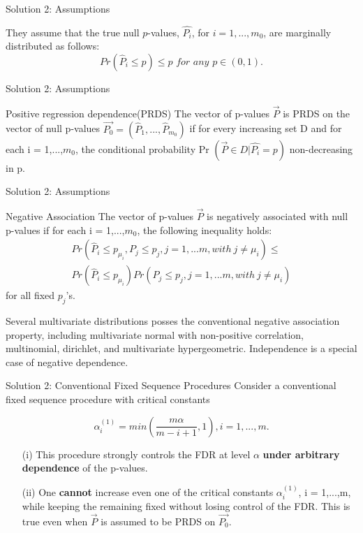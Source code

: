 \documentclass{beamer}
\begin{document}
\begin{frame}[t]{Solution 2: Assumptions}\vspace{10pt}

They assume that the true null $p$-values, $\hat{P_i}$, for $i = 1,...,m_0$, are marginally distributed as follows:
$$ Pr\left(\hat P_i \leq p \right) \leq p \,\,for \,\,any \,\,p \in (0,1).$$

\end{frame}

\begin{frame}[t]{Solution 2: Assumptions}\vspace{10pt}
\begin{block}{Positive regression dependence(PRDS)}
The vector of p-values $\overrightarrow{P}$ is PRDS on the vector of null p-values $\overrightarrow{P_0} = (\hat{P}_1,...,\hat{P}_{m_0})$ if for every increasing set D and for each i = 1,...,$m_0$, the conditional probability Pr $\left(\overrightarrow{P} \in D | \hat{P_i} = p\right)$ non-decreasing in p.
\end{block}
\end{frame}

\begin{frame}[t]{Solution 2: Assumptions}\vspace{10pt}
\begin{block}{Negative Association}
The vector of p-values $\overrightarrow{P}$ is negatively associated with null p-values if for each i = 1,...,$m_0$, the following inequality holds:
\begin{align*}
Pr\left( \hat{P}_i \leq p_{\mu_i} , P_j \leq p_j , j = 1,...m, with \ j \neq \mu_i \right) \leq \\
Pr \left(\hat{P}_i \leq p_{\mu_i} \right) Pr \left( P_j \leq p_j , j = 1,...m, with \ j \neq \mu_i\right)
\end{align*}
for all fixed $p_j$'s.
\end{block}

Several multivariate distributions posses the conventional negative association property, including multivariate normal with non-positive correlation, multinomial, dirichlet, and multivariate hypergeometric. Independence is a special case of negative dependence.
\end{frame}

\begin{frame}[t]{Solution 2: Conventional Fixed Sequence Procedures}\vspace{10pt}
Consider a conventional fixed sequence procedure with critical constants

$$ \alpha_i^{(1)} = min \left(\frac{m\alpha}{m-i+1} ,1\right), i =1,...,m. $$
\begin{itemize}
	\item[(i)] This procedure strongly controls the FDR at level $\alpha$ \textbf{under arbitrary dependence} of the p-values.
	\item[(ii)] One \textbf{cannot} increase even one of the critical constants $\alpha_i^{(1)}$, i = 1,...,m, while keeping the remaining fixed without losing control of the FDR. This is true even when $\overrightarrow{P}$ is assumed to be PRDS on $\overrightarrow{P_0}$.
\end{itemize}
\end{frame}
\end{document}
